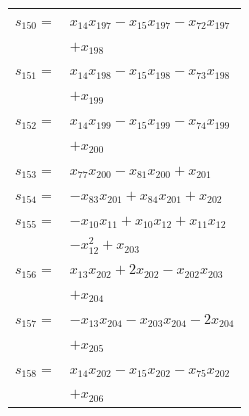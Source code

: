 \begin{longtable}{@{}r@{\;}l@{}}
\(s_{150}=\) & \(\displaystyle x_{14}x_{197} -x_{15}x_{197} -x_{72}x_{197}\) \\
 & \(\displaystyle +x_{198}\) \\[3pt]
\(s_{151}=\) & \(\displaystyle x_{14}x_{198} -x_{15}x_{198} -x_{73}x_{198}\) \\
 & \(\displaystyle +x_{199}\) \\[3pt]
\(s_{152}=\) & \(\displaystyle x_{14}x_{199} -x_{15}x_{199} -x_{74}x_{199}\) \\
 & \(\displaystyle +x_{200}\) \\[3pt]
\(s_{153}=\) & \(\displaystyle x_{77}x_{200} -x_{81}x_{200} +x_{201}\) \\[3pt]
\(s_{154}=\) & \(\displaystyle -x_{83}x_{201} +x_{84}x_{201} +x_{202}\) \\[3pt]
\(s_{155}=\) & \(\displaystyle -x_{10}x_{11} +x_{10}x_{12} +x_{11}x_{12}\) \\
 & \(\displaystyle -x_{12}^{2} +x_{203}\) \\[3pt]
\(s_{156}=\) & \(\displaystyle x_{13}x_{202} +2x_{202} -x_{202}x_{203}\) \\
 & \(\displaystyle +x_{204}\) \\[3pt]
\(s_{157}=\) & \(\displaystyle -x_{13}x_{204} -x_{203}x_{204} -2x_{204}\) \\
 & \(\displaystyle +x_{205}\) \\[3pt]
\(s_{158}=\) & \(\displaystyle x_{14}x_{202} -x_{15}x_{202} -x_{75}x_{202}\) \\
 & \(\displaystyle +x_{206}\) \\[3pt]
\end{longtable}
\endgroup
